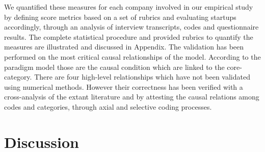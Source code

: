 \documentclass[10pt,journal,letterpaper,compsoc]{IEEEtran}
\begin{document}
We quantified these measures for each company involved in our empirical study by defining score metrics based on a set of rubrics and evaluating startups accordingly, through an analysis of interview transcripts, codes and questionnaire results. The complete statistical procedure and provided rubrics to quantify the measures are illustrated and discussed in Appendix.
The validation has been performed on the most critical  causal relationships of the model. According to the paradigm model those are the causal condition which are linked to the core-category. There are four high-level relationships  which have not been validated using numerical methods. However their correctness has been verified with a cross-analysis of the extant literature and by attesting the causal relations among codes and categories, through axial and selective coding processes. 


\section{Discussion} %
\label{sect:theory:impl}

\end{document}

